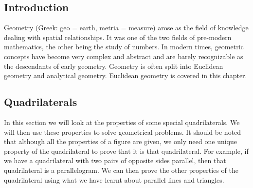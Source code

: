 \subsection{ Introduction}
\nopagebreak
Geometry (Greek: geo = earth, metria = measure) arose as the field of knowledge dealing with spatial relationships. It was one of the two fields of pre-modern mathematics, the other being the study of numbers. In modern times, geometric concepts have become very complex and abstract and are barely recognizable as the descendants of early geometry. Geometry is often split into Euclidean geometry and analytical geometry. Euclidean geometry is covered in this chapter.\par 


\subsection{ Quadrilaterals}
\nopagebreak
In this section we will look at the properties of some special quadrilaterals. We will then use these properties to solve geometrical problems. It should be noted that although all the properties of a figure are given, we only need one unique property of the quadrilateral to prove that it is that quadrilateral. For example, if we have a quadrilateral with two pairs of opposite sides parallel, then that quadrilateral is a parallelogram. We can then prove the other properties of the quadrilateral using what we have learnt about parallel lines and triangles.\par 

